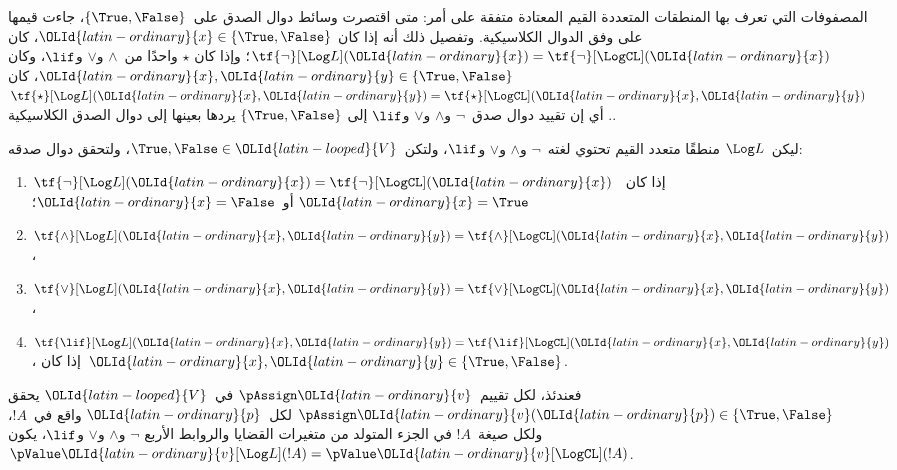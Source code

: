 \documentclass[../../../include/open-logic-section]{subfiles}
\begin{document}


المصفوفات التي تعرف بها المنطقات المتعددة القيم المعتادة متفقة على
أمر: متى اقتصرت وسائط دوال الصدق على~$\{\True, \False\}$، جاءت
قيمها على وفق الدوال الكلاسيكية. وتفصيل ذلك أنه إذا كان
$\OLId{latin-ordinary}{x} \in \{\True, \False\}$، كان
$\tf{\lnot}[\Log L](\OLId{latin-ordinary}{x}) = \tf{\lnot}[\LogCL](\OLId{latin-ordinary}{x})$؛ وإذا كان
$\star$ واحدًا من~$\land$ و$\lor$ و$\lif$، وكان
$\OLId{latin-ordinary}{x}, \OLId{latin-ordinary}{y} \in \{\True, \False\}$، كان
$\tf{\star}[\Log L](\OLId{latin-ordinary}{x},\OLId{latin-ordinary}{y}) = \tf{\star}[\LogCL](\OLId{latin-ordinary}{x},\OLId{latin-ordinary}{y})$. أي إن تقييد
دوال صدق~$\lnot$ و$\land$ و$\lor$ و$\lif$ إلى
$\{\True,\False\}$ يردها بعينها إلى دوال الصدق الكلاسيكية.

\begin{prop}
  ليكن~$\Log L$ منطقًا متعدد القيم تحتوي لغته~$\lnot$ و$\land$
  و$\lor$ و$\lif$، ولتكن~$\True, \False \in \OLId{latin-looped}{V}$، ولتحقق دوال صدقه:
  \begin{enumerate}
    \item{} $\tf{\lnot}[\Log L](\OLId{latin-ordinary}{x}) = \tf{\lnot}[\LogCL](\OLId{latin-ordinary}{x})$ إذا كان~$\OLId{latin-ordinary}{x} =
    \True$ أو~$\OLId{latin-ordinary}{x} = \False$؛
    \item{} $\tf{\land}[\Log L](\OLId{latin-ordinary}{x},\OLId{latin-ordinary}{y}) = \tf{\land}[\LogCL](\OLId{latin-ordinary}{x},\OLId{latin-ordinary}{y})$،
    \item{} $\tf{\lor}[\Log L](\OLId{latin-ordinary}{x},\OLId{latin-ordinary}{y}) = \tf{\lor}[\LogCL](\OLId{latin-ordinary}{x},\OLId{latin-ordinary}{y})$،
    \item{} $\tf{\lif}[\Log L](\OLId{latin-ordinary}{x},\OLId{latin-ordinary}{y}) = \tf{\lif}[\LogCL](\OLId{latin-ordinary}{x},\OLId{latin-ordinary}{y})$،
    إذا كان~$\OLId{latin-ordinary}{x}, \OLId{latin-ordinary}{y} \in \{\True, \False\}$.
  \end{enumerate}
  فعندئذ، لكل تقييم~$\pAssign \OLId{latin-ordinary}{v}$ في~$\OLId{latin-looped}{V}$ يحقق
  $\pAssign \OLId{latin-ordinary}{v}(\OLId{latin-ordinary}{p}) \in \{\True,\False\}$ لكل~$\OLId{latin-ordinary}{p}$ واقع في~$!A$، ولكل
  صيغة~$!A$ في الجزء المتولد من متغيرات القضايا والروابط الأربع
  $\lnot$ و$\land$ و$\lor$ و$\lif$، يكون
  $\pValue \OLId{latin-ordinary}{v}[\Log L](!A) = \pValue \OLId{latin-ordinary}{v}[\LogCL](!A)$.
\end{prop}
\end{document}
